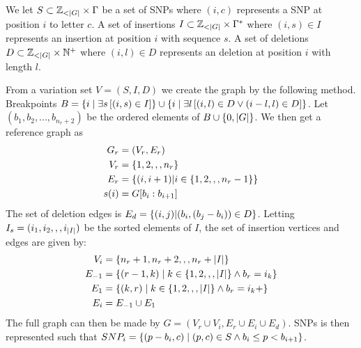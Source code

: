 We let $S \subset \mathbb{Z} _{<\left|G\right|} \times \Gamma $ be a set of SNPs  where $(i, c)$ represents a SNP at position $i$ to letter $c$. 
A set of insertions $I \subset \mathbb{Z} _{<\left|G\right|} \times \Gamma^*$ where $(i, s) \in I$ represents an insertion at position $i$ with sequence $s$.
A set of deletions $D \subset \mathbb{Z} _{<\left|G\right|} \times \mathbb{N}^+$ where $(i, l) \in D$ represents an deletion at position $i$ with length $l$.

From a variation set $V=(S, I, D)$ we create the graph by the following method.
Breakpoints $B = \left\{i \mid \exists s \left[(i, s) \in I\right]\right\} \cup \left\{i \mid \exists l \left[(i, l) \in D \vee (i-l, l) \in D\right]\right\}$.
Let $(b_1, b_2, ..., b_{n_r+2})$ be the ordered elements of $B \cup \left\{0, \left|G\right|\right\}$. We then get a reference graph as
\begin{align*}
  G_r &= (V_r, E_r)\\
  V_r &= \left\{1, 2,,, n_r\right\}\\
  E_r &= \left\{(i, i+1) | i \in \left\{1,2,,,n_r-1\right\}\right\}\\
  s(i) &= G[b_i:b_{i+1}]
\end{align*}
The set of deletion edges is $E_d=\left\{(i, j) | (b_i, (b_j-b_i)) \in D\right\}$. 
Letting $I_s = (i_1, i_2,,, i_{\left|I\right|})$ be the sorted elements of $I$, the set of insertion vertices and edges are given by:
  \begin{align*}
    V_i &= \left\{n_r+1, n_r+2,,, n_r+\left|I\right|\right\}\\
    E_{-1} &= \left\{(r-1, k) \mid k \in \left\{1, 2,,,\left|I\right|\right\} \wedge b_r=i_k\right\}\\
    E_{1} &= \left\{(k, r) \mid k \in \left\{1, 2,,,\left|I\right|\right\} \wedge b_r=i_k+\right\}\\
    E_i &= E_{-1} \cup E_1\\
  \end{align*}
The full graph can then be made by $G = (V_r \cup V_i, E_r \cup E_i \cup E_d)$.
SNPs is then represented such that $SNP_i = \left\{(p-b_i, c) \mid (p, c) \in S \wedge b_i\leq p < b_{i+1}\right\}$. 
